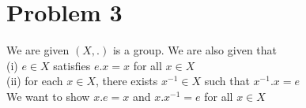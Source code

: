 \documentclass{article}
\begin{document}
\section*{Problem 3}
We are given \((X, .)\) is a group. We are also given that \\
(i) \(e \in X\) satisfies \(e.x = x\) for all \(x \in X\) \\
(ii) for each \(x \in X\), there exists \(x^{-1} \in X\) such that \(x^{-1}.x = e\) \\

We want to show \(x.e = x\) and \(x.x^{-1} = e\) for all \(x \in X\) \\
\end{document}
